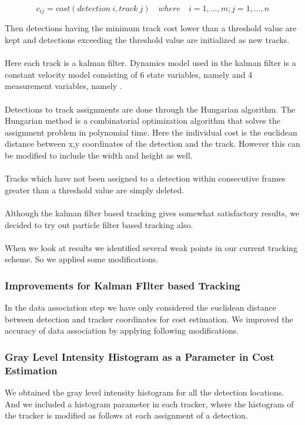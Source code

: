 \documentclass[12pt,a4paper]{report}
\begin{document}
\begin{equation}
 c_{ij}= cost(detection\ i, track\ j) \quad  where \quad i=1,...,m ; j=1,...,n
\end{equation}

Then detections having the minimum track cost lower than a threshold value are kept and detections exceeding the threshold value are initialized as new tracks. \\\\
Here each track is a kalman filter. Dynamics model used in the kalman filter is a constant velocity model consisting of 6 state variables, namely  and 4 measurement variables, namely  .\\\\
Detections to track assignments are done through the Hungarian algorithm. The Hungarian method is a combinatorial optimization algorithm that solves the assignment problem in polynomial time. Here the individual cost is the euclidean distance between x,y coordinates of the detection and the track. However this can be modified to include the width and height as well.\\\\
Tracks which have not been assigned to a detection within consecutive frames greater than a threshold value are simply deleted. \\\\
Although the kalman filter based tracking gives somewhat satisfactory results, we decided to try out particle filter based tracking also.\\\\
When we look at results we identified several weak points in our current tracking scheme. So we applied some modifications.

\subsubsection{Improvements for Kalman FIlter based Tracking}
In the data association step we have only considered the euclidean distance between detection and tracker coordinates for cost estimation. We improved the accuracy of data association by applying following modifications.

\subsubsection{Gray Level Intensity Histogram as a Parameter in Cost Estimation}
We obtained the gray level intensity histogram for all the detection locations. And we included a histogram parameter in each tracker, where the histogram of the tracker is modified as follows at each assignment of a detection.
\end{document}
